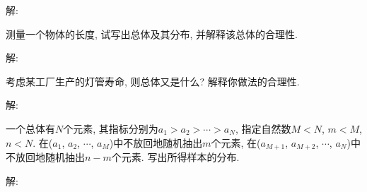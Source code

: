 \documentclass[standard]{ExBook}
\begin{document}
\begin{qitems}
\vspace{-5em}

    \begin{bbox}
解: 
    \end{bbox}

\vspace{-5em}

    \begin{bbox}
    \begin{shaded}
        \qitem
测量一个物体的长度, 试写出总体及其分布, 并解释该总体的合理性.
    \end{shaded}
    \end{bbox}

\vspace{-5em}

    \begin{bbox}
解: 
    \end{bbox}

\vspace{-5em}

    \begin{bbox}
    \begin{shaded}
        \qitem
考虑某工厂生产的灯管寿命, 则总体又是什么? 解释你做法的合理性.
    \end{shaded}
    \end{bbox}

\vspace{-5em}

    \begin{bbox}
解: 
    \end{bbox}

\vspace{-5em}

    \begin{bbox}
    \begin{shaded}
        \qitem
一个总体有$N$个元素, 其指标分别为$a_1 > a_2 > \cdots > a_N$, 指定自然数$M < N$, $m < M$, $n < N$. 在($a_1$, $a_2$, $\cdots$, $a_M$)中不放回地随机抽出$m$个元素, 在($a_{M+1}$, $a_{M+2}$, $\cdots$, $a_{N}$)中不放回地随机抽出$n-m$个元素. 写出所得样本的分布.
    \end{shaded}
    \end{bbox}

\vspace{-5em}

    \begin{bbox}
解: 
    \end{bbox}

\vspace{-5em}


\end{qitems}
\end{document}
